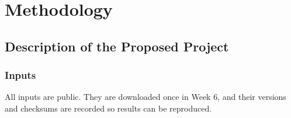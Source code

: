 \section{Methodology}
\label{sec:method}

\subsection{Description of the Proposed Project}

\subsubsection{Inputs}

All inputs are public. They are downloaded once in Week 6, and their versions and checksums are recorded so results can be reproduced.

